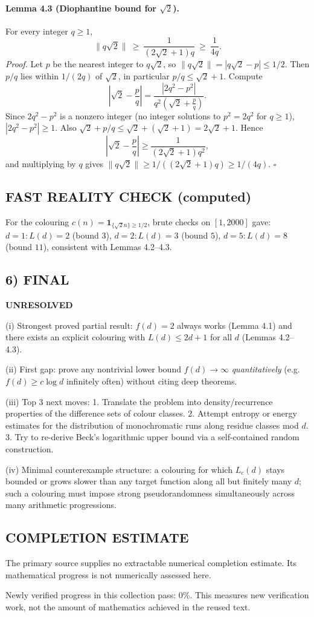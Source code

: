 \paragraph{Lemma 4.3 (Diophantine bound for $\sqrt2$).}
For every integer $q\ge 1$,
\[
\|q\sqrt2\|\ \ge\ \frac{1}{(2\sqrt2+1)q}\ \ge\ \frac{1}{4q}.
\]
\textit{Proof.}
Let $p$ be the nearest integer to $q\sqrt2$, so $\|q\sqrt2\|=|q\sqrt2-p|\le 1/2$.
Then $p/q$ lies within $1/(2q)$ of $\sqrt2$, in particular $p/q\le \sqrt2+1$.
Compute
\[
\left|\sqrt2-\frac{p}{q}\right|=\frac{|2q^2-p^2|}{q^2\left(\sqrt2+\frac{p}{q}\right)}.
\]
Since $2q^2-p^2$ is a nonzero integer (no integer solutions to $p^2=2q^2$ for $q\ge 1$), $|2q^2-p^2|\ge 1$.
Also $\sqrt2+p/q\le \sqrt2+(\sqrt2+1)=2\sqrt2+1$. Hence
\[
\left|\sqrt2-\frac{p}{q}\right|\ge \frac{1}{(2\sqrt2+1)q^2},
\]
and multiplying by $q$ gives $\|q\sqrt2\|\ge 1/((2\sqrt2+1)q)\ge 1/(4q)$. \hfill$\square$

\subsection*{FAST REALITY CHECK (computed)}
For the colouring $c(n)=\mathbf{1}_{\{\sqrt2 n\}\ge 1/2}$, brute checks on $[1,2000]$ gave:
$d=1: L(d)=2$ (bound $3$), $d=2: L(d)=3$ (bound $5$), $d=5: L(d)=8$ (bound $11$), consistent with Lemmas 4.2--4.3.

\subsection*{6) FINAL}
\textbf{UNRESOLVED}

(i) Strongest proved partial result: $f(d)=2$ always works (Lemma 4.1) and there exists an explicit colouring with
$L(d)\le 2d+1$ for all $d$ (Lemmas 4.2--4.3).

(ii) First gap: prove any nontrivial lower bound $f(d)\to\infty$ \emph{quantitatively} (e.g. $f(d)\ge c\log d$ infinitely often) without citing deep theorems.

(iii) Top 3 next moves:
1. Translate the problem into density/recurrence properties of the difference sets of colour classes.
2. Attempt entropy or energy estimates for the distribution of monochromatic runs along residue classes mod $d$.
3. Try to re-derive Beck’s logarithmic upper bound via a self-contained random construction.

(iv) Minimal counterexample structure: a colouring for which $L_c(d)$ stays bounded or grows slower than any target function along all but finitely many $d$; such a colouring
must impose strong pseudorandomness simultaneously across many arithmetic progressions.



\subsection*{COMPLETION ESTIMATE}
The primary source supplies no extractable numerical completion estimate. Its mathematical progress is not numerically assessed here.

Newly verified progress in this collection pass: $0\%$. This measures new verification work, not the amount of mathematics achieved in the reused text.

